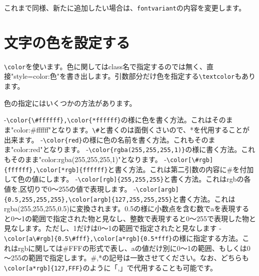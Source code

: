 これまで同様、新たに追加したい場合は、\verb+fontvariant+の内容を変更します。

\section{文字の色を設定する}
\verb+\color+を使います。色に関してはclass名で指定するのでは無く、直接"style=color:色"を書き出します。引数部分だけ色を指定する\verb+\textcolor+もあります。

色の指定にはいくつかの方法があります。

-\verb+\color{\#ffffff},\color{*ffffff}+の様に色を書く方法。これはそのまま"color:\#ffffff"となります。\verb+\#+と書くのは面倒くさいので、*を代用することが出来ます。
-\verb+\color{red}+の様に色の名前を書く方法。これもそのまま"color:red"となります。
-\verb+\color{rgba(255,255,255,1)}+の様に書く方法。これもそのまま"color:rgba(255,255,255,1)"となります。
-\verb+\color[\#rgb]{ffffff},\color[*rgb]{ffffff}+と書く方法。これは第二引数の内容に\#を付加して色の値にします。
-\verb+\color[rgb]{255,255,255}+と書く方法。これはrgbの各値を,区切りで0～255の値で表現します。
-\verb+\color[argb]{0.5,255,255,255},\color[argb]{127,255,255,255}+と書く方法。これはrgba(255,255,255,0.5)に変換されます。0.5の様に小数点を含む数でaを表現すると0～1の範囲で指定された物と見なし、整数で表現すると0～255で表現した物と見なします。{\color{\cred}ただし、1だけは0～1の範囲で指定されたと見なします}
-\verb+\color[a\#rgb]{0.5\#fff},\color[a*rgb]{0.5*fff}+の様に指定する方法。これはrgbに関しては\#FFFの形式で表し、aの値だけ別に0～1の範囲、もしくは0～255の範囲で指定します。\#,*の記号は一致させてください。なお、どちらも\verb+\color[a*rgb]{127,FFF}+のように「,」で代用することも可能です。


